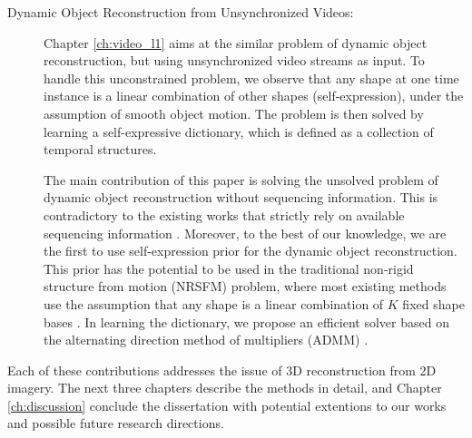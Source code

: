 \begin{description}
\item[Dynamic Object Reconstruction from Unsynchronized Videos:]
Chapter \ref{ch:video_l1} aims at the similar problem of dynamic object reconstruction, but using unsynchronized video streams as input. To handle this unconstrained problem, we observe that any shape at one time instance is a linear combination of other shapes (self-expression), under the assumption of smooth object motion. The problem is then solved by learning a self-expressive dictionary, which is defined as a collection of temporal structures. 

The main contribution of this paper is solving the unsolved problem of dynamic object reconstruction without sequencing information. This is contradictory to the existing works that strictly rely on available sequencing information \cite{Park_ECCV2010,Valmadre_CVPR2012}. Moreover, to the best of our knowledge, we are the first to use self-expression prior for the dynamic object reconstruction. This prior has the potential to be used in the traditional non-rigid structure from motion (NRSFM) problem, where most existing methods use the assumption that any shape is a linear combination of $K$ fixed shape bases \cite{dai2014simple,Bregler_CVPR2000}. In learning the dictionary, we propose an efficient solver based on the alternating direction method of multipliers (ADMM) \cite{boyd2011distributed}.

\end{description}

Each of these contributions addresses the issue of 3D reconstruction from 2D imagery. The next three chapters describe the methods in detail, and Chapter \ref{ch:discussion} conclude the dissertation with potential extentions to our works and possible future research directions. 

